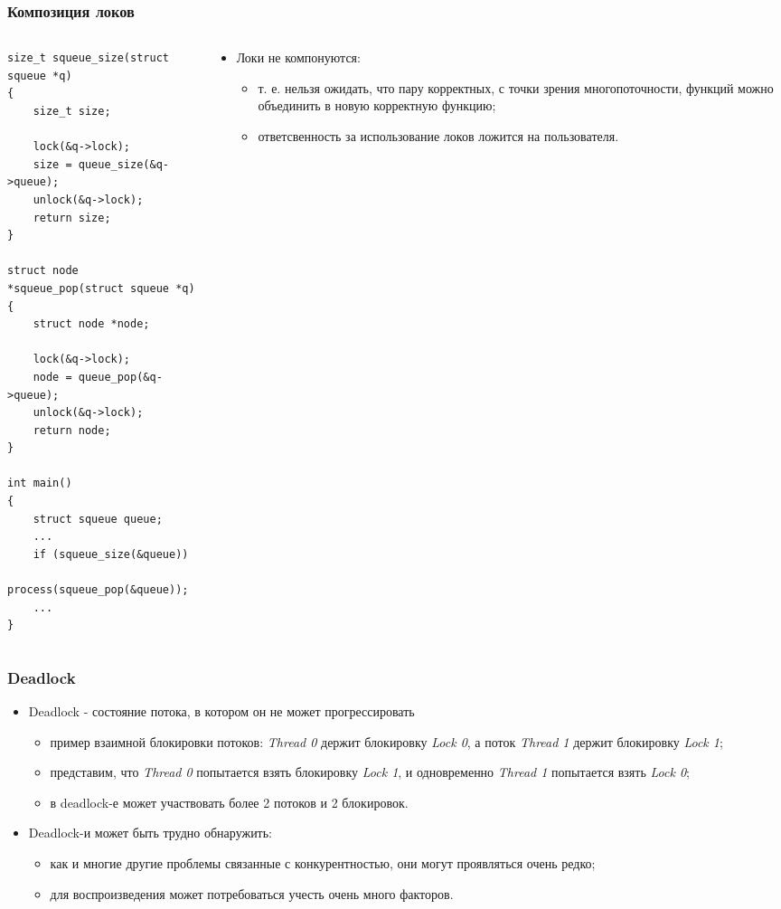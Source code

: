 \begin{frame}[fragile]
\frametitle{Композиция локов}
\begin{columns}
  \begin{column}{.5\linewidth}
    \begin{lstlisting}
size_t squeue_size(struct squeue *q)
{
    size_t size;

    lock(&q->lock);
    size = queue_size(&q->queue);
    unlock(&q->lock);
    return size;
}

struct node *squeue_pop(struct squeue *q)
{
    struct node *node;

    lock(&q->lock);
    node = queue_pop(&q->queue);
    unlock(&q->lock);
    return node;
}

int main()
{
    struct squeue queue;
    ...
    if (squeue_size(&queue))
        process(squeue_pop(&queue));
    ...
}
    \end{lstlisting}
  \end{column}
  \begin{column}{.6\linewidth}
    \begin{itemize}
      \item Локи не компонуются:
      \begin{itemize}
        \item т. е. нельзя ожидать, что пару корректных, с точки зрения
        многопоточности, функций можно объединить в новую корректную функцию;
        \item ответсвенность за использование локов ложится на пользователя.
      \end{itemize}
    \end{itemize}
  \end{column}
\end{columns}
\end{frame}

\begin{frame}
\frametitle{Deadlock}
\begin{itemize}
  \item Deadlock - состояние потока, в котором он не может прогрессировать
  \begin{itemize}
    \item пример взаимной блокировки потоков: \emph{Thread 0} держит блокировку
    \emph{Lock 0}, а поток \emph{Thread 1} держит блокировку \emph{Lock 1};
    \item представим, что \emph{Thread 0} попытается взять блокировку
    \emph{Lock 1}, и одновременно \emph{Thread 1} попытается взять
    \emph{Lock 0};
    \item в deadlock-е может участвовать более 2 потоков и 2 блокировок.
  \end{itemize}
  \item Deadlock-и может быть трудно обнаружить:
  \begin{itemize}
    \item как и многие другие проблемы связанные с конкурентностью, они могут
    проявляться очень редко;
    \item для воспроизведения может потребоваться учесть очень много факторов.
  \end{itemize}
\end{itemize}
\end{frame}

